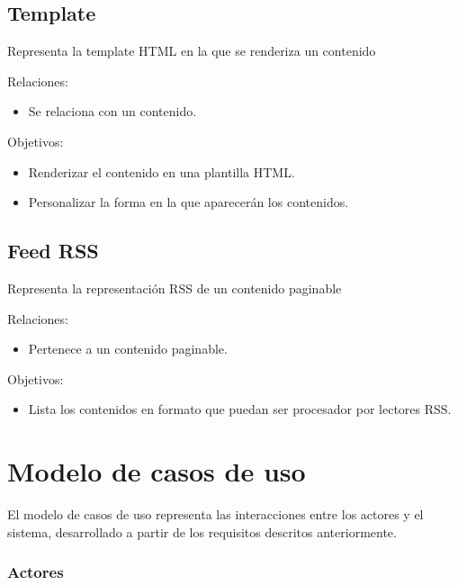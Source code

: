 \subsection{Template}

Representa la template HTML en la que se renderiza un contenido

Relaciones:
\begin{itemize}
    \item Se relaciona con un contenido.
\end{itemize}

Objetivos:
\begin{itemize}
    \item Renderizar el contenido en una plantilla HTML.
    \item Personalizar la forma en la que aparecerán los contenidos.
\end{itemize}

\subsection{Feed RSS}

Representa la representación RSS de un contenido paginable

Relaciones:
\begin{itemize}
    \item Pertenece a un contenido paginable.
\end{itemize}

Objetivos:
\begin{itemize}
    \item Lista los contenidos en formato que puedan ser procesador por lectores RSS.
\end{itemize}


\section{Modelo de casos de uso}

El modelo de casos de uso representa las interacciones entre los actores y el sistema, 
desarrollado a partir de los requisitos descritos anteriormente.

\subsubsection{Actores}

